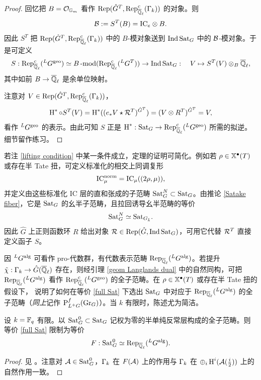 \begin{proof}
回忆把 $B=\mO_{\bG_m}$ 看作 $\on{Rep}(\hat G^T,{\on{Rep}^c_{\Ql}(\Ga_k)})$ 的对象。则
\[\mB:=S^T(B)= \IC_e\otimes B.\]
因此 $S^T$ 把 $\on{Rep}(\hat G^T,{\on{Rep}^c_{\Ql}(\Ga_k)})$ 中的 $B$-模对象送到 $\on{Ind}\Sat_G$ 中的 $\mB$-模对象。于是可定义
\[S: \on{Rep}^c_{\Ql}({^L}G^{\on{geo}})\simeq B\on{-mod}(\on{Rep}^c_{\Ql}({^L}G^T)) \to \on{Ind}\Sat_G:\quad V\mapsto S^T(V)\otimes_{B}\Ql,\]
其中如前 $B\to\Ql$ 是余单位映射。

注意对 $V\in \on{Rep}(\hat G^T,{\on{Rep}^c_{\Ql}(\Ga_k)})$，
\[\on{H}^*\circ S^T(V)=\on{H}^*((e_*V\star \mR^T)^{\hat G^T})=(V\otimes R^T)^{\hat G^T}=V,\]
看作 ${^L}G^{\on{geo}}$ 的表示。由此可知 $S$ 正是 $\on{H}^*:\Sat_G\to \on{Rep}^c_{\Ql}({^L}G^{\on{geo}})$ 所需的拟逆。细节留作练习。
\end{proof}

\begin{rmk}\label{simplify}
若注 \ref{lifting condition} 中某一条件成立，定理的证明可简化。例如若 $\rho\in\xch(T)$ 或存在半 Tate 扭，可定义标准化的相交上同调复形
\[\IC_\mu^{\on{norm}}=\IC_\mu((2\rho,\mu)),\]
并定义由这些标准化 IC 层的直和张成的子范畴 $\Sat_G^N\subset \Sat_G$。由推论 \ref{Satake fiber}，它是 $\Sat_G$ 的幺半子范畴，且拉回诱导幺半范畴的等价
\[\Sat_G^N\simeq \Sat_{G_{\bar k}}.\]
因此 $\hat G$ 上正则函数环 $R$ 给出对象 $\mR\in \on{Rep}(\hat G,{\on{Ind}\Sat_G})$，可用它代替 $\mR^T$ 直接定义函子 $S$。
\end{rmk}

因 ${^L}G^{\on{alg}}$ 可看作 pro-代数群，有代数表示范畴 $\on{Rep}_\Ql({^L}G^{\on{alg}})$。若提升 $\tilde \chi:\Ga_k\to \hat G(\Ql)$ 存在，则经引理 \ref{geom Langlands dual} 中的自然同构，可把 $\on{Rep}_\Ql({^L}G^{\on{alg}})$ 看作 $\on{Rep}^c_{\Ql}({^L}G^{\on{geo}})$ 的全子范畴。在 $\rho\in \xch(T)$ 或存在半 Tate 扭的假设下，\cite{RZ} 说明了如何在等价 \eqref{full Sat} 下选出 $\Sat_G$ 中对应于 $\on{Rep}_\Ql({^L}G^{\on{alg}})$ 的全子范畴（\emph{同上}记作 $\on{P}_{L^+G}^f(\Gr_G)$）。当 $k$ 有限时，陈述尤为简洁。

\begin{prop}
设 $k=\bF_q$ 有限。以 $\Sat_G^0\subset \Sat_G$ 记权为零的半单纯反常层构成的全子范畴。则等价 \eqref{full Sat} 限制为等价
\[F:\Sat_G^0\simeq \on{Rep}_\Ql({^L}G^{\on{alg}}).\]
\end{prop}

\begin{proof}
见 \cite[Remark A.9, Proposition A.10]{RZ}。注意对 $\mA\in\Sat_G^0$，$\Ga_k$ 在 $F(\mA)$ 上的作用与 $\Ga_k$ 在 $\oplus_i \on{H}^i(\mA(\frac{i}{2}))$ 上的自然作用一致。
\end{proof}

